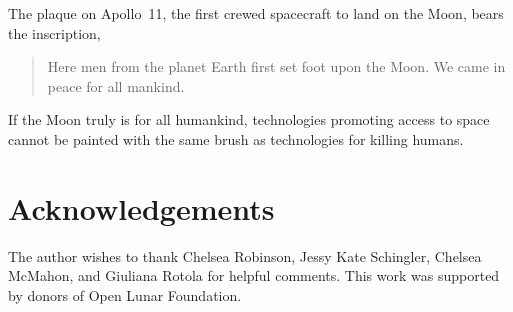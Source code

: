 \documentclass[preprint,twocolumn,5p]{elsarticle}
\begin{document}
The plaque on Apollo~11, the first crewed spacecraft to land on the Moon, bears the inscription,
\begin{quote}Here men from the planet Earth first set foot upon the Moon. We came in peace for all mankind.\end{quote} If the Moon truly is for all humankind, technologies promoting access to space cannot be painted with the same brush as technologies for killing humans.

\section{Acknowledgements}
The author wishes to thank Chelsea Robinson, Jessy Kate Schingler, Chelsea McMahon, and Giuliana Rotola for helpful comments. This work was supported by donors of Open Lunar Foundation.

%
%   
\end{document}

